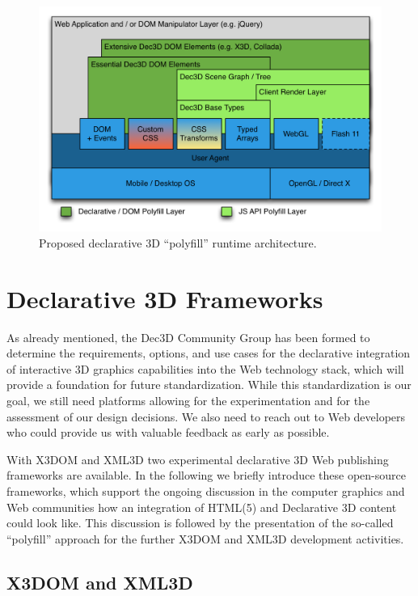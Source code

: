\documentclass[review]{acmsiggraph}
\begin{document}
\begin{figure}
  \centering
  \includegraphics[width=1.0\columnwidth]{images/Dec3D-Architecture.png}
  \caption{Proposed declarative 3D ``polyfill'' runtime architecture.}
  \label{fig:polyArch}
  \vspace{-0.2cm}
\end{figure}


\section{Declarative 3D Frameworks}
\label{sec:Frameworks}

As already mentioned, the Dec3D Community Group \cite{Dec3D} has been formed to determine the requirements, options, and use cases for the declarative integration of interactive 3D graphics capabilities into the Web technology stack, which will provide a foundation for future standardization. While this standardization is our goal, we still need platforms allowing for the experimentation and for the assessment of our design decisions. We also need to reach out to Web developers who could provide us with valuable feedback as early as possible.

With X3DOM \cite{Behr2009} and XML3D \cite{Sons2010} two experimental declarative 3D Web publishing frameworks are available. In the following we briefly introduce these open-source frameworks, which support the ongoing discussion in the computer graphics and Web communities how an integration of HTML(5) and Declarative 3D content could look like. This discussion is followed by the presentation of the so-called ``polyfill'' approach for the further X3DOM and XML3D development activities.


\subsection{X3DOM and XML3D}
\end{document}
